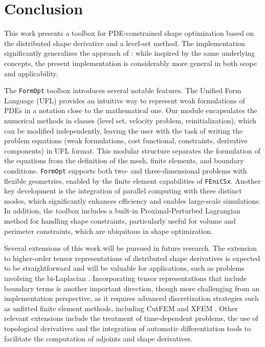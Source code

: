 \documentclass[preprint,9pt]{elsarticle}
\begin{document}
\section{Conclusion}

This work presents a toolbox for PDE-constrained shape optimization
based on the distributed shape derivative and a level-set method.
The implementation significantly generalizes
the approach of \cite{MR3843884}:
while inspired by the same underlying concepts,
the present implementation is considerably
more general in both scope and applicability.

The \texttt{FormOpt} toolbox introduces several notable features.
The Unified Form Language (UFL) provides an intuitive way
to represent weak formulations of PDEs in a notation
close to the mathematical one. 
Our module encapsulates the numerical methods in classes
(level set, velocity problem, reinitialization),
which can be modified independently,
leaving the user with the task of writing the problem equations
(weak formulations, cost functional, constraints, derivative components)
in UFL format.
This modular structure separates the formulation of the equations
from the definition of the mesh, finite elements, and boundary conditions.
\texttt{FormOpt}  supports both two- and three-dimensional problems with
flexible geometries, enabled by the finite element capabilities
of \texttt{FEniCSx}. Another key development is the integration of
parallel computing with three distinct modes,
which significantly enhances efficiency and enables
large-scale simulations. In addition,
the toolbox includes a built-in Proximal-Perturbed Lagrangian method
for handling shape constraints, particularly useful for volume
and perimeter constraints, which are ubiquitous in shape optimization.

Several extensions of this work will be pursued in future research.
The extension to higher-order tensor representations of
distributed shape derivatives is expected to be straightforward
and will be valuable for applications, such as problems
involving the bi-Laplacian \cite{LL2024}.
Incorporating tensor representations that include boundary
terms is another important direction, though more challenging
from an implementation perspective, as it requires advanced
discretization strategies such as unfitted finite element methods,
including CutFEM \cite{MR3416285} and XFEM \cite{belytschko2001arbitrary}. 
Other relevant extensions include the treatment of
time-dependent problems, the use of topological derivatives
\cite{MR4916810,MR3013681} and the integration of automatic
differentiation tools
\cite{Allaire2024,BLAUTH2023101577,MR4233697,MR4034755,MR4244971}
to facilitate the computation of adjoints and shape derivatives.
\end{document}
